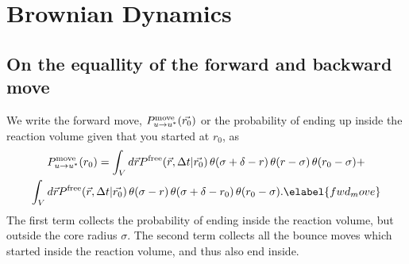 
\section{Brownian Dynamics}

\subsection{ On the equallity of the forward and backward move}
We write the forward move, $P^{\rm move}_{u \rightarrow u^*}(\vec{r_0})$ or the probability of ending up inside the reaction volume given that you started at $r_0$, as
\begin{multline}
 P^{\rm move}_{u \rightarrow u^*}(r_0) = \int_{V} d\vec{r} P^{\rm free}(\vec{r},\Delta t|\vec{r_0}) \, \theta(\sigma + \delta - r) \, \theta(r - \sigma) \, \theta(r_0 - \sigma) + \\ \int_{V} d\vec{r} P^{\rm free}(\vec{r},\Delta t|\vec{r_0}) \, \theta(\sigma - r) \, \theta(\sigma + \delta - r_0)  \, \theta(r_0 - \sigma).
\elabel{fwd_move}
\end{multline}
The first term collects the probability of ending inside the reaction volume, but outside the core radius $\sigma$. The second term collects all the bounce moves which started inside the reaction volume, and thus also end inside.

